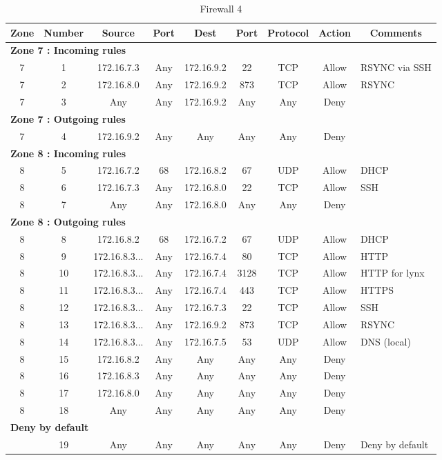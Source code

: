 \documentclass[a4paper,titlepage]{article}
\begin{document}
\begin{table}[h]
	\center
	\begin{tabular}{c|c|cc|cc|ccl}
		Zone & Number & Source & Port & Dest & Port & Protocol & Action & \multicolumn{1}{c}{Comments}\\
		\hline
		\multicolumn{9}{l}{\textbf{Zone 7 : Incoming rules}}\\
		7 & 1 & 172.16.7.3 & Any & 172.16.9.2 & 22 & TCP & Allow & RSYNC via SSH\\
		7 & 2 & 172.16.8.0 & Any & 172.16.9.2 & 873 & TCP & Allow &  RSYNC\\
		7 & 3 & Any & Any & 172.16.9.2 & Any & Any & Deny & \\
		\hline
		\multicolumn{9}{l}{\textbf{Zone 7 : Outgoing rules}}\\
		7 & 4 & 172.16.9.2 & Any & Any & Any & Any & Deny & \\

		\hline
		\multicolumn{9}{l}{\textbf{Zone 8 : Incoming rules}}\\
		8 & 5 & 172.16.7.2 & 68 &  172.16.8.2 & 67 & UDP & Allow & DHCP\\
		8 & 6 & 172.16.7.3 & Any & 172.16.8.0 & 22 & TCP & Allow & SSH \\
		8 & 7 & Any & Any & 172.16.8.0 & Any & Any & Deny & \\
		\hline
		\multicolumn{9}{l}{\textbf{Zone 8 : Outgoing rules}}\\
		8 & 8 & 172.16.8.2 & 68 & 172.16.7.2 & 67 & UDP & Allow & DHCP\\
		8 & 9 & 172.16.8.3... & Any & 172.16.7.4 & 80 & TCP & Allow & HTTP \\
		8 & 10 & 172.16.8.3... & Any & 172.16.7.4 & 3128 & TCP & Allow & HTTP for lynx\\
		8 & 11 & 172.16.8.3... & Any & 172.16.7.4 & 443 & TCP & Allow & HTTPS \\
		8 & 12 & 172.16.8.3... & Any & 172.16.7.3 & 22 & TCP & Allow & SSH \\
		8 & 13 & 172.16.8.3... & Any & 172.16.9.2 & 873 & TCP & Allow & RSYNC \\
		8 & 14 & 172.16.8.3... & Any & 172.16.7.5 & 53 & UDP & Allow & DNS (local) \\
		8 & 15 & 172.16.8.2 & Any & Any & Any & Any & Deny & \\
		8 & 16 & 172.16.8.3 & Any & Any & Any & Any & Deny & \\
		8 & 17 & 172.16.8.0 & Any & Any & Any & Any & Deny & \\
		8 & 18 & Any & Any & Any & Any & Any & Deny & \\
		\hline
		\multicolumn{9}{l}{\textbf{Deny by default}}\\
		  & 19 & Any & Any & Any & Any & Any & Deny & Deny by default\\
		\hline
	\end{tabular}
	\caption{Firewall 4}
\end{table}
\end{document}
